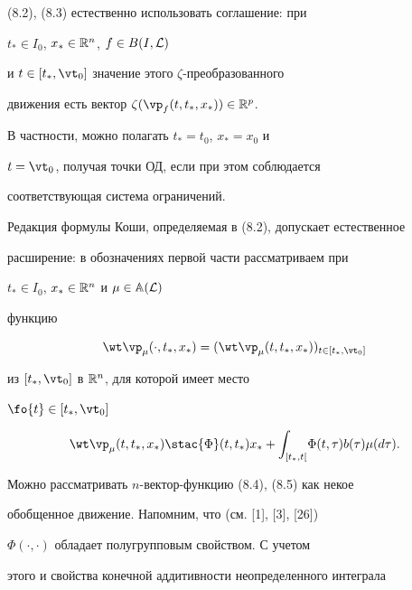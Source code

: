 (8.2), (8.3) естественно использовать соглашение: при


${t_*} \in {I_0}$, ${x_*} \in {{\Bbb R}^n}$, $f \in B(I,{\cal L})$


и $t \in [{t_*},{{\vt}_0}]$ значение этого $\zeta$-преобразованного


движения есть вектор ${\zeta}({{\vp}_f}(t,{t_*},{x_*})) \in {{\Bbb R}^p}$.


В частности, можно полагать ${t_*} = {t_0}$, ${x_*} = {x_0}$ и


$t = {{\vt}_0}$, получая точки ОД, если при этом соблюдается


соответствующая система ограничений.





Редакция формулы Коши, определяемая в (8.2), допускает естественное


расширение: в обозначениях первой части рассматриваем при


${t_*} \in {I_0}$, ${x_*} \in {{\Bbb R}^n}$ и $\mu \in {{\Bbb A}({\cal L})}$


функцию


\begin{equation}


{{\wt \vp}_\mu}(\cdot,{t_*},{x_*}) =


({{\wt \vp}_\mu}(t,{t_*},{x_*}))_{t \in [{t_*},{{\vt}_0}]}


\end{equation}


из $[{t_*},{{\vt}_0}]$ в ${{\Bbb R}^n}$, для которой имеет место


$\fo{t} \in [{t_*},{{\vt}_0}]$


\begin{equation}


{{\wt \vp}_\mu}(t,{t_*},{x_*}) \stac {\Phi}(t,{t_*}){x_*} +


{\int_{[{t_*},t[}}{\Phi}(t,\tau){b(\tau)}{{\mu}(d\tau)}.


\end{equation}





Можно рассматривать $n$-вектор-функцию (8.4), (8.5) как некое


обобщенное движение. Напомним, что (см. [1], [3], [26])


${\Phi}(\cdot,\cdot)$ обладает полугрупповым свойством. С учетом


этого и свойства конечной аддитивности неопределенного интеграла


